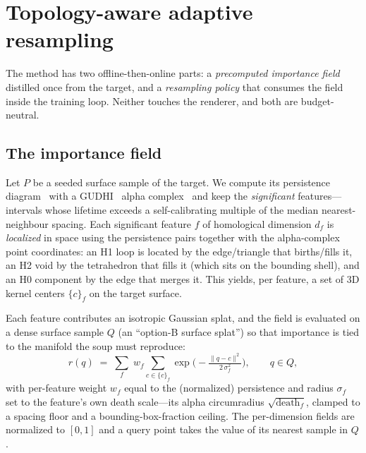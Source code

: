 \section{Topology-aware adaptive resampling}
\label{sec:method}

The method has two offline-then-online parts: a \emph{precomputed importance
field} distilled once from the target, and a \emph{resampling policy} that
consumes the field inside the training loop. Neither touches the renderer, and
both are budget-neutral.

\subsection{The importance field}
\label{sec:method-field}
Let $P$ be a seeded surface sample of the target. We compute its persistence
diagram~\cite{edelsbrunner2002persistence} with a GUDHI~\cite{maria2014gudhi}
alpha complex~\cite{edelsbrunner1994alphashapes} and keep the \emph{significant}
features---intervals whose lifetime exceeds a self-calibrating multiple of the median
nearest-neighbour spacing. Each significant feature $f$ of homological dimension
$d_f$ is \emph{localized} in space using the persistence pairs together with the
alpha-complex point coordinates: an H1 loop is located by the edge/triangle that
births/fills it, an H2 void by the tetrahedron that fills it (which sits on the
bounding shell), and an H0 component by the edge that merges it. This yields, per
feature, a set of 3D kernel centers $\{c\}_f$ on the target surface.

Each feature contributes an isotropic Gaussian splat, and the field is evaluated
on a dense surface sample $Q$ (an ``option-B surface splat'') so that importance
is tied to the manifold the soup must reproduce:
\begin{equation}
  r(q) \;=\; \sum_{f}\; w_f \sum_{c\in\{c\}_f}
            \exp\!\Big(-\tfrac{\lVert q-c\rVert^2}{2\,\sigma_f^2}\Big),
  \qquad q\in Q,
  \label{eq:splat}
\end{equation}
with per-feature weight $w_f$ equal to the (normalized) persistence and radius
$\sigma_f$ set to the feature's own death scale---its alpha circumradius
$\sqrt{\text{death}_f}$, clamped to a spacing floor and a bounding-box-fraction
ceiling. The per-dimension fields are normalized to $[0,1]$ and a query point
takes the value of its nearest sample in $Q$.

